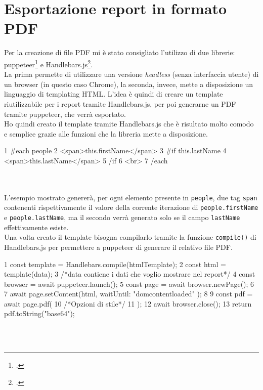 \section{Esportazione report in formato PDF}
Per la creazione di file PDF mi è stato consigliato l'utilizzo di due librerie: puppeteer\footcite{site:puppeteer} e Handlebars.js\footcite{site:handlebars}.\\
La prima permette di utilizzare una versione \textit{headless} (senza interfaccia utente) di un browser (in questo caso Chrome), la seconda, invece, mette a disposizione un linguaggio di templating HTML. L'idea è quindi di creare un template riutilizzabile per i report tramite Handlebars.js, per poi generarne un PDF tramite puppeteer, che verrà esportato.\\
Ho quindi creato il template tramite Handlebars.js che è risultato molto comodo e semplice grazie alle funzioni che la libreria mette a disposizione.

\begin{code}[frame=tb,title={Esempio di utilizzo di Handlebars.js}]
1 {{#each people}}
2   <span>{{this.firstName}}</span> 
3   {{#if this.lastName}}
4     <span>{{this.lastName}}</span>
5   {{/if}}
6   <br>
7 {{/each}} 
\end{code}\\\\

\noindent L'esempio mostrato genererà, per ogni elemento presente in \texttt{people}, due tag \texttt{span} contenenti rispettivamente il valore della corrente iterazione di \texttt{people.firstName} e \texttt{people.lastName}, ma il secondo verrà generato solo se il campo \texttt{lastName} effettivamente esiste.\\
Una volta creato il template bisogna compilarlo tramite la funzione \texttt{compile()} di Handlebars.js per permettere a puppeteer di generare il relativo file PDF.

\begin{code}[frame=tb,title={Esempio di utilizzo di puppeteer per la creazione di file PDF}]
1   const template = Handlebars.compile(htmlTemplate);
2   const html = template(data);  
3   /*data contiene i dati che voglio mostrare nel report*/
4   const browser = await puppeteer.launch();
5   const page = await browser.newPage();
6 
7   await page.setContent(html, { waitUntil: "domcontentloaded" });
8 
9   const pdf = await page.pdf({
10     /*Opzioni di stile*/
11  });
12  await browser.close();
13  return pdf.toString("base64");
\end{code}\\\\

